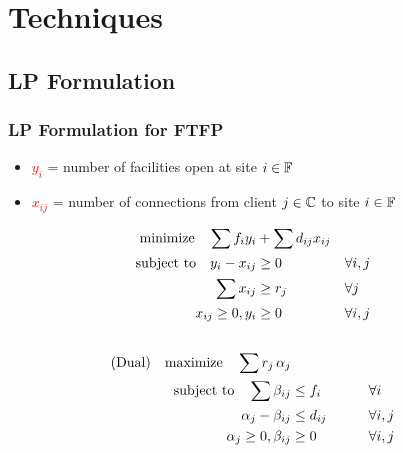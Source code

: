 \documentclass[hyperref,dvipsnames,svgnames,compress]{beamer}
\begin{document}

\section[Techniques]{Techniques}
\subsection[LP]{LP Formulation}
\begin{frame}
  \frametitle{LP Formulation for FTFP}
  \begin{itemize}
  \item \textcolor{red}{$y_i$} = number of facilities open at site $i\in \mathbb{F}$
  \item \textcolor{red}{$x_{ij}$} = number of connections from client $j\in
    \mathbb{C}$ to site $i \in \mathbb{F}$
  \end{itemize}
  \begin{alignat}{3}
    \textrm{minimize}\quad \sum f_iy_i &+ \sum d_{ij}x_{ij}&
    \\ \notag
    \textrm{subject to}\quad y_i - x_{ij} &\geq 0  & &\forall i,j
    \\ \notag
    \sum x_{ij} &\geq r_j & &\forall j
    \\ \notag
    x_{ij} \geq 0, y_i &\geq 0 & &\forall i,j
    \\ \notag
  \end{alignat}
  \begin{alignat}{3}
  \text{(Dual)}\quad  \textrm{maximize}\quad \sum r_j\, \alpha_j&
    \\ \notag
    \textrm{subject to} \quad 
      \sum \beta_{ij} &\leq f_i  &\quad\quad			&\forall i
    \\ \notag
    \alpha_{j} - \beta_{ij} 	&\leq  d_{ij}       &                 & \forall i,j
    \\ \notag
    \alpha_j \geq 0, \beta_{ij} &\geq 0           &            & \forall i,j
  \end{alignat}
\end{frame}
\end{document}
